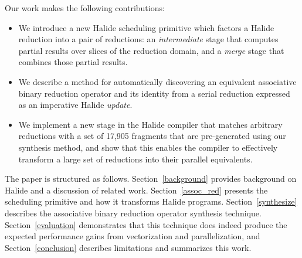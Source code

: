 \begin{figure}
{}
\label{fig:rfactor}
\end{figure}

Our work makes the following contributions:
\begin{itemize}
  \item We introduce a new Halide scheduling primitive  which factors a Halide reduction into a pair of reductions: an \emph{intermediate} stage that computes partial results over slices of the reduction domain, and a \emph{merge} stage that combines those partial results.
  \item We describe a method for automatically discovering an equivalent associative binary reduction operator and its identity from a serial reduction expressed as an imperative Halide \emph{update}.
  \item We implement a new stage in the Halide compiler that matches arbitrary reductions with a set of 17,905 fragments that are pre-generated using our synthesis method, and show that this enables the compiler to effectively transform a large set of reductions into their parallel equivalents.
\end{itemize}

The paper is structured as follows. Section~\ref{background} provides background on Halide and a discussion of related work. Section~\ref{assoc_red} presents the  scheduling primitive and how it transforms Halide programs. Section~\ref{synthesize} describes the associative binary reduction operator synthesis technique. Section~\ref{evaluation} demonstrates that this technique does indeed produce the expected performance gains from vectorization and parallelization, and Section~\ref{conclusion} describes limitations and summarizes this work.


